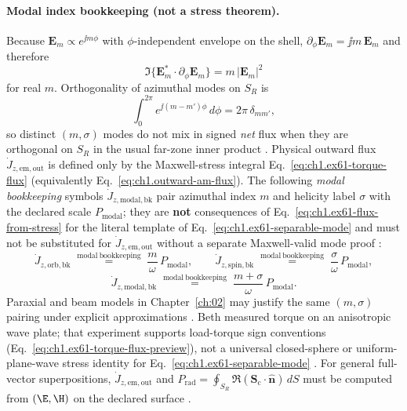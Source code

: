 \paragraph{Modal index bookkeeping (not a stress theorem).}
Because $\mathbf{E}_m\propto e^{\jj m\phi}$ with $\phi$-independent envelope on the shell, $\partial_\phi\mathbf{E}_m=\jj m\,\mathbf{E}_m$ and therefore
\begin{equation}
\label{eq:ch1.ex61-phi-identity}
\Im\{\mathbf{E}_m^*\cdot\partial_\phi\mathbf{E}_m\}=m\,|\mathbf{E}_m|^2
\end{equation}
for real $m$. Orthogonality of azimuthal modes on $S_R$ is
\begin{equation}
\label{eq:ch1.ex61-phi-orthogonality}
\int_0^{2\pi} e^{\jj(m-m')\phi}\,d\phi=2\pi\,\delta_{mm'},
\end{equation}
so distinct $(m,\sigma)$ modes do not mix in signed \emph{net} flux when they are orthogonal on $S_R$ in the usual far-zone inner product \cite{stratton1941,allen1992}. Physical outward flux $\dot J_{z,\mathrm{em,out}}$ is defined only by the Maxwell-stress integral Eq.~\eqref{eq:ch1.ex61-torque-flux} (equivalently Eq.~\eqref{eq:ch1.outward-am-flux}). The following \emph{modal bookkeeping} symbols $\dot J_{z,\mathrm{modal,bk}}$ pair azimuthal index $m$ and helicity label $\sigma$ with the declared scale $P_{\mathrm{modal}}$; they are \textbf{not} consequences of Eq.~\eqref{eq:ch1.ex61-flux-from-stress} for the literal template of Eq.~\eqref{eq:ch1.ex61-separable-mode} and must not be substituted for $\dot J_{z,\mathrm{em,out}}$ without a separate Maxwell-valid mode proof \cite{allen1992,stratton1941}:
\begin{equation}
\label{eq:ch1.ex61-orbital-from-stress}
\dot J_{z,\mathrm{orb,bk}}\;\stackrel{\mathrm{modal\ bookkeeping}}{=}\;\frac{m}{\omega}\,P_{\mathrm{modal}},
\qquad
\dot J_{z,\mathrm{spin,bk}}\;\stackrel{\mathrm{modal\ bookkeeping}}{=}\;\frac{\sigma}{\omega}\,P_{\mathrm{modal}},
\end{equation}
\begin{equation}
\label{eq:ch1.ex61-helicity-transport-law}
\dot J_{z,\mathrm{modal,bk}}\;\stackrel{\mathrm{modal\ bookkeeping}}{=}\;\frac{m+\sigma}{\omega}\,P_{\mathrm{modal}}.
\end{equation}
Paraxial and beam models in Chapter~\ref{ch:02} may justify the same $(m,\sigma)$ pairing under explicit approximations \cite{allen1992}. Beth \cite{beth1936} measured torque on an anisotropic wave plate; that experiment supports load-torque sign conventions (Eq.~\eqref{eq:ch1.ex61-torque-flux-preview}), not a universal closed-sphere or uniform-plane-wave stress identity for Eq.~\eqref{eq:ch1.ex61-separable-mode} \cite{beth1936,stratton1941}. For general full-vector superpositions, $\dot J_{z,\mathrm{em,out}}$ and $P_{\mathrm{rad}}=\oint_{S_R}\Re(\mathbf{S}_\mathrm{c}\cdot\hat{\mathbf{n}})\,dS$ must be computed from $(\E,\H)$ on the declared surface \cite{stratton1941,beth1936}.

